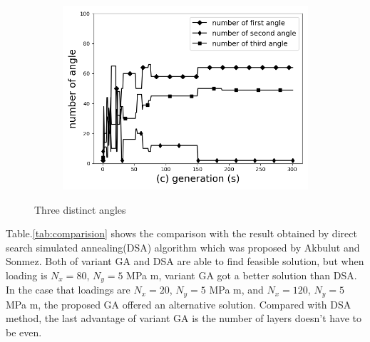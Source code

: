 \begin{figure}[!t]
		\begin{subfigure}[b]{0.8\linewidth}                           
			\includegraphics[width=\linewidth]{Figures/chapter3/part2/image/three_distinct_angle_number_of_angle.png}
		\end{subfigure}
	\caption{Three distinct angles}
	\label{fig:three_angles}
\end{figure}





Table.\ref{tab:comparision} shows the comparison with the result obtained by
direct search simulated annealing(DSA) algorithm which was proposed by Akbulut
and Sonmez\cite{akbulut2008optimum}.  Both of variant GA and DSA are able to
find feasible solution, but when loading is $N_x=80$, $N_y=5$ MPa m, variant GA
got a better solution than DSA. In the case that loadings are $N_x=20$, $N_y=5$ MPa m,
and $N_x=120$, $N_y=5$ MPa m,  the proposed GA offered an alternative solution. Compared
with DSA method, the last advantage of variant GA is the number of layers
doesn't have to be even.

